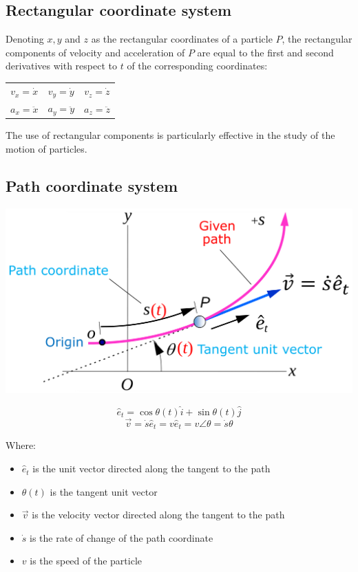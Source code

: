 \documentclass[11pt]{article}
\begin{document}
\subsection{Rectangular coordinate system}
\label{sec:orgad8bfd9}
Denoting \(x, y\) and \(z\) as the rectangular coordinates of a particle \(P\), the rectangular components of velocity and acceleration of \(P\) are equal to the first and second derivatives with respect to \(t\) of the corresponding coordinates:
\begin{center}
\begin{tabular}{ c c c }
$v_x = \dot{x}$ & $v_y = \dot{y}$ & $v_z = \dot{z}$ \\
$a_x = \ddot{x}$ & $a_y = \ddot{y}$ & $a_z = \ddot{z}$
\end{tabular}
\end{center}

The use of rectangular components is particularly effective in the study of the motion of particles.
\subsection{Path coordinate system}
\label{sec:org295503c}
\begin{center}
\includegraphics[width=.9\linewidth]{./images/path-coordinate-system.png}
\end{center}

\[\hat{e}_t = \cos \theta (t) \hat{i} + \sin \theta (t) \hat{j}\]
\[\vec{v} = \dot{s} \hat{e}_t = v \hat{e}_t = v \angle \theta = \dot{s} \theta\]

Where:
\begin{itemize}
\item \(\hat{e}_t\) is the unit vector directed along the tangent to the path
\item \(\theta (t)\) is the tangent unit vector
\item \(\vec{v}\) is the velocity vector directed along the tangent to the path
\item \(\dot{s}\) is the rate of change of the path coordinate
\item \(v\) is the speed of the particle
\end{itemize}
\end{document}
